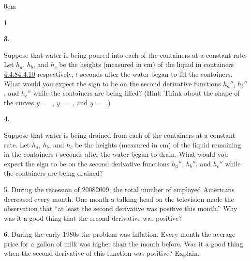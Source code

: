 \documentclass[12pt,]{book}
\theoremstyle{plain}
\theoremstyle{definition}
\numberwithin{equation}{section}
\newenvironment{exercisegroup}%
{\medskip\noindent}%
{\par\bigskip}%
\newlength{\exercisegroupindent}%
\newlength{\exercisegroupitemwidth}%
\newenvironment{exercisegrouplist}%
{\vspace{-\partopsep}%
\begin{adjustwidth}{\exercisegroupindent}{0em}}%
{\end{adjustwidth}%
\vspace{-\partopsep}%
\vspace{\baselineskip}}%
\newenvironment{exercisegroupbycol}[1]%
{\begin{exercisegrouplist}%
\vspace{-\multicolsep}%
\begin{multicols}{#1}%
\setlength{\parindent}{0em}%
\setlength{\exercisegroupitemwidth}{\linewidth}}%
{\end{multicols}%
\vspace{-\multicolsep}%
\end{exercisegrouplist}}%
\newenvironment{exercisegroupitem}[1]%
{\begin{minipage}[t]{\exercisegroupitemwidth}
\vspace{0pt}%
{\bfseries#1}%
\rule{0pt}{\baselineskip}}{\strut%
\end{minipage}%
\hspace{\columnsep}}%
\providecommand\phantomsection{}
\newcommand{\fe}[2]{\mathop{{#1}{\left(#2\right)}}}
\newcommand{\sd}[1]{#1''}
\begin{document}
\begin{exerciselist}
\begin{exercisegroup}
\begin{exercisegroupbycol}{1}
\begin{exercisegroupitem}{3. }\phantomsection\hypertarget{exercise-237}{\null}
Suppose that water is being poured into each  of the containers at a constant rate.  Let \(h_a\), \(h_b\), and \(h_c\) be the heights (measured in \si{\centi\meter}) of the liquid in containers \hyperref[figure-prism-uniform]{4.4.8}\textendash{}\hyperref[figure-prism-bottom-heavy]{4.4.10} respectively, \(t\) seconds after the water began to fill the containers.  What would you expect the sign to be on the second derivative functions \(\sd{h_a}\), \(\sd{h_b}\), and \(\sd{h_c}\) while the containers are being filled?  (Hint:  Think about the shape of the curves \(y=\fe{\sd{h_a}}{t}\), \(y=\fe{\sd{h_b}}{t}\), and \(y=\fe{\sd{h_c}}{t}\).)%
\end{exercisegroupitem}%
\par%
\begin{exercisegroupitem}{4. }\phantomsection\hypertarget{exercise-238}{\null}
Suppose that water is being drained from each  of the containers at a constant rate.  Let \(h_a\), \(h_b\), and \(h_c\) be the heights (measured in \si{\centi\meter}) of the liquid remaining in the containers \(t\) seconds after the water began to drain.  What would you expect the sign to be on the second derivative functions \(\sd{h_a}\), \(\sd{h_b}\), and \(\sd{h_c}\)  while the containers are being drained?%
\end{exercisegroupitem}%
\par%
\end{exercisegroupbycol}%
\end{exercisegroup}%
\item[5.]\phantomsection\hypertarget{exercise-239}{\null}During the recession of 2008\textendash{}2009, the total number of employed Americans decreased every month.  One month a talking head on the television made the observation that ``at least the second derivative was positive this month.''  Why was it a good thing that the second derivative was positive?%
\par\smallskip
\item[6.]\phantomsection\hypertarget{exercise-240}{\null}During the early 1980s the problem was inflation. Every month the average price for a gallon of milk was higher than the month before.  Was it a good thing when the second derivative of this function was positive?  Explain.%
\par\smallskip
\end{exerciselist}
\typeout{************************************************}
\typeout{************************************************}
\end{document}

